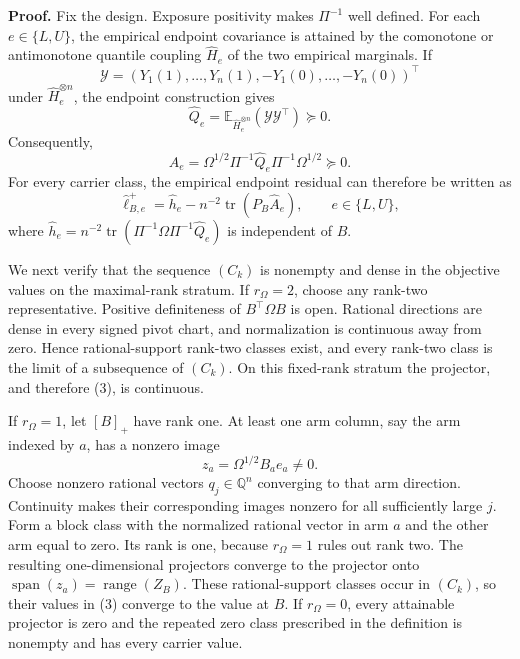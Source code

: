 \textbf{Proof.}
Fix the design.  Exposure positivity makes \(\Pi^{-1}\) well defined.  For each \(e\in\{L,U\}\), the empirical endpoint covariance is attained by the comonotone or antimonotone quantile coupling \(\widehat H_e\) of the two empirical marginals.  If
\[
\mathcal Y=(Y_1(1),\ldots,Y_n(1),-Y_1(0),\ldots,-Y_n(0))^{\top}
\]
under \(\widehat H_e^{\otimes n}\), the endpoint construction gives
\[
\widehat Q_e=\mathbb E_{\widehat H_e^{\otimes n}}(\mathcal Y\mathcal Y^{\top})\succeq0.
\tag{1}
\]
Consequently,
\[
\widehat A_e
=\Omega^{1/2}\Pi^{-1}\widehat Q_e\Pi^{-1}\Omega^{1/2}
\succeq0.
\tag{2}
\]
For every carrier class, the empirical endpoint residual can therefore be written as
\[
\widehat\ell_{B,e}^+
=\widehat h_e-n^{-2}\operatorname{tr}(P_B\widehat A_e),
\qquad e\in\{L,U\},
\tag{3}
\]
where \(\widehat h_e=n^{-2}\operatorname{tr}(\Pi^{-1}\Omega\Pi^{-1}\widehat Q_e)\) is independent of \(B\).

We next verify that the sequence \((C_k)\) is nonempty and dense in the objective values on the maximal-rank stratum.  If \(r_\Omega=2\), choose any rank-two representative.  Positive definiteness of \(B^{\top}\Omega B\) is open.  Rational directions are dense in every signed pivot chart, and normalization is continuous away from zero.  Hence rational-support rank-two classes exist, and every rank-two class is the limit of a subsequence of \((C_k)\).  On this fixed-rank stratum the projector, and therefore (3), is continuous.

If \(r_\Omega=1\), let \([B]_+\) have rank one.  At least one arm column, say the arm indexed by \(a\), has a nonzero image
\[
z_a=\Omega^{1/2}B_ae_a\ne0.
\]
Choose nonzero rational vectors \(q_j\in\mathbb Q^n\) converging to that arm direction.  Continuity makes their corresponding images nonzero for all sufficiently large \(j\).  Form a block class with the normalized rational vector in arm \(a\) and the other arm equal to zero.  Its rank is one, because \(r_\Omega=1\) rules out rank two.  The resulting one-dimensional projectors converge to the projector onto \(\operatorname{span}(z_a)=\operatorname{range}(Z_B)\).  These rational-support classes occur in \((C_k)\), so their values in (3) converge to the value at \(B\).  If \(r_\Omega=0\), every attainable projector is zero and the repeated zero class prescribed in the definition is nonempty and has every carrier value.

